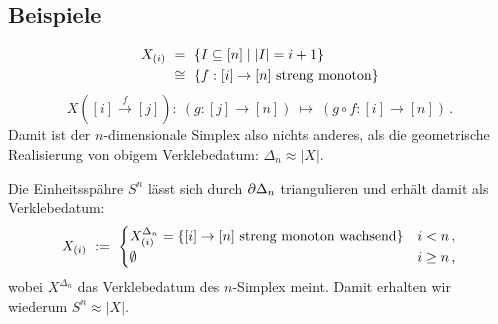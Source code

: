\subsection{Beispiele}

\begin{beispiel}
  \begin{align*}
    X_{(i)} \ &=\  \{ I\subseteq [n] \mid |I| = i+1\}\\
    \ &\cong\  \{ f: [i] \to [n] \text{ streng monoton}\}
  \end{align*}
  \[ X([i] \xrightarrow{f} [j]):\ 
    (g:[j]\to[n]) \ \longmapsto\  (g\circ f: [i]\to[n])\,.\]
  Damit ist der $n$-dimensionale Simplex also nichts anderes, als die
  geometrische Realisierung von obigem Verklebedatum: $\Delta_n \approx |X|$.
\end{beispiel}

\begin{beispiel}
  Die Einheitsspähre $S^n$ lässt sich durch $\partial\Delta_n$ triangulieren und
  erhält damit als Verklebedatum:
  \[ X_{(i)} \ :=\  \begin{cases}
    X_{(i)}^{\Delta_n} = \{[i] \to [n] \text{ streng monoton wachsend}\}
      & i < n\,,\\
      \emptyset & i \geq n\,,\end{cases}\]
  wobei $X^{\Delta_n}$ das Verklebedatum des $n$-Simplex meint.
  Damit erhalten wir wiederum $S^n \approx |X|$.
\end{beispiel}
